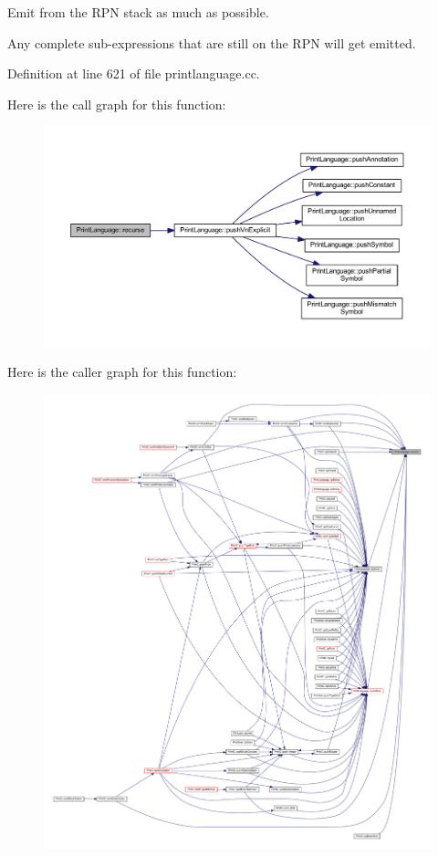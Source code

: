 Emit from the R\+PN stack as much as possible. 

Any complete sub-\/expressions that are still on the R\+PN will get emitted. 

Definition at line 621 of file printlanguage.\+cc.

Here is the call graph for this function\+:
\nopagebreak
\begin{figure}[H]
\begin{center}
\leavevmode
\includegraphics[width=350pt]{class_print_language_a193f787ccd9f5466a7b97feb084687d6_cgraph}
\end{center}
\end{figure}
Here is the caller graph for this function\+:
\nopagebreak
\begin{figure}[H]
\begin{center}
\leavevmode
\includegraphics[width=350pt]{class_print_language_a193f787ccd9f5466a7b97feb084687d6_icgraph}
\end{center}
\end{figure}
\mbox{\label{class_print_language_aeb989b6e336308e202e82035595443fb}} 
